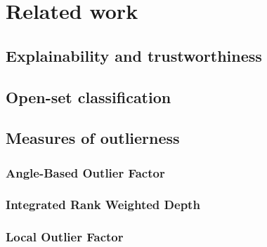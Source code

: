 \chapter{Related work}
\label{chapter:related-work}

\lipsum[1]


\section{Explainability and trustworthiness}
\label{section:trustworthiness}

\lipsum[1]


\section{Open-set classification}
\label{section:contributions}

\lipsum[1]


\section{Measures of outlierness}
\label{section:measures}

\lipsum[1]


\subsection{Angle-Based Outlier Factor}
\label{section:abof}

\lipsum[1]


\subsection{Integrated Rank Weighted Depth}
\label{section:irwd}

\lipsum[1]


\subsection{Local Outlier Factor}
\label{section:lof}

\lipsum[1]

